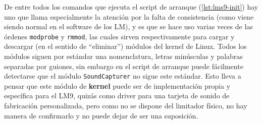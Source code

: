 De entre todos los comandos que ejecuta el script de arranque (\ref{lst:lms9-init}) hay uno que llama especialmente la atención por la falta de consistencia (como viene siendo normal en el software de los LM), y es que se hace uso varias veces de las órdenes \verb|modprobe| y \verb|rmmod|, las cuales sirven respectivamente para cargar y descargar (en el sentido de ``eliminar'') módulos del kernel de Linux. Todos los módulos siguen por estándar una nomenclatura, letras minúsculas y palabras separadas por guiones, sin embargo en el script de arranque puede fácilmente detectarse que el módulo \verb|SoundCapturer| no sigue este estándar. Esto lleva a pensar que este módulo de \textbf{kernel} puede ser de implementación propia y específica para el \acrshort{LM9}, quizás como driver para una tarjeta de sonido de fabricación personalizada, pero como no se dispone del limitador físico, no hay manera de confirmarlo y no puede dejar de ser una suposición. \\

